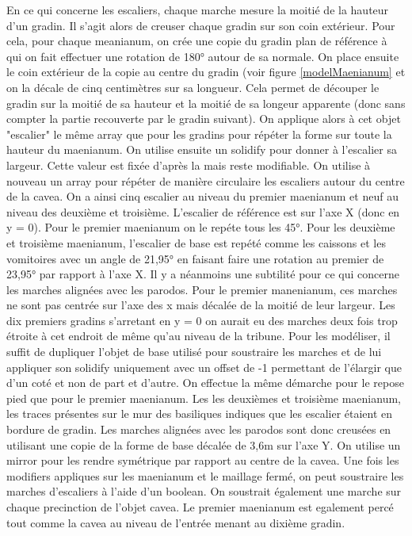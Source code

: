 En ce qui concerne les escaliers, chaque marche mesure la moitié de la hauteur d'un gradin. Il s'agit alors de creuser chaque gradin sur son coin extérieur. Pour cela, pour chaque meanianum, on crée une copie du gradin plan de référence à qui on fait effectuer une rotation de 180° autour de sa normale. On place ensuite le coin extérieur de la copie au centre du gradin (voir figure \ref{modelMaenianum} et on la décale de cinq centimètres sur sa longueur. Cela permet de découper le gradin sur la moitié de sa hauteur et la moitié de sa longeur apparente (donc sans compter la partie recouverte par le gradin suivant). On applique alors à cet objet "escalier" le même \gls{array} que pour les gradins pour répéter la forme sur toute la hauteur du maenianum. On utilise ensuite un \gls{solidify} pour donner à l'escalier sa largeur. Cette valeur est fixée d'après la \cite[Pl. XIX]{orangePl} mais reste modifiable. On utilise à nouveau un \gls{array} pour répéter de manière circulaire les escaliers autour du centre de la cavea. On a ainsi cinq escalier au niveau du premier maenianum et neuf au niveau des deuxième et troisième. L'escalier de référence est sur l'axe X (donc en y = 0). Pour le premier maenianum on le repéte tous les 45°. Pour les deuxième et troisième maenianum, l'escalier de base est repété comme les caissons et les vomitoires avec un angle de 21,95° en faisant faire une rotation au premier de 23,95° par rapport à l'axe X. Il y a néanmoins une subtilité pour ce qui concerne les marches alignées avec les \gls{parodos}. Pour le premier manenianum, ces marches ne sont pas centrée sur l'axe des x mais décalée de la moitié de leur largeur. Les dix premiers gradins s'arretant en y = 0 on aurait eu des marches deux fois trop étroite à cet endroit de même qu'au niveau de la tribune. Pour les modéliser, il suffit de dupliquer l'objet de base utilisé pour soustraire les marches et de lui appliquer son \gls{solidify} uniquement avec un offset de -1 permettant de l'élargir que d'un coté et non de part et d'autre. On effectue la même démarche pour le repose pied que pour le premier maenianum. Les les deuxièmes et troisième maenianum, les traces présentes sur le mur des basiliques indiques que les escalier étaient en bordure de gradin. Les marches alignées avec les \gls{parodos} sont donc creusées en utilisant une copie de la forme de base décalée de 3,6m sur l'axe Y. On utilise un \gls{mirror} pour les rendre symétrique par rapport au centre de la cavea.
Une fois les modifiers appliques sur les maenianum et le maillage fermé, on peut soustraire les marches d'escaliers à l'aide d'un \gls{boolean}. On soustrait également une marche sur chaque precinction de l'objet cavea. Le premier maenianum est egalement percé tout comme la cavea au niveau de l'entrée menant au dixième gradin.


